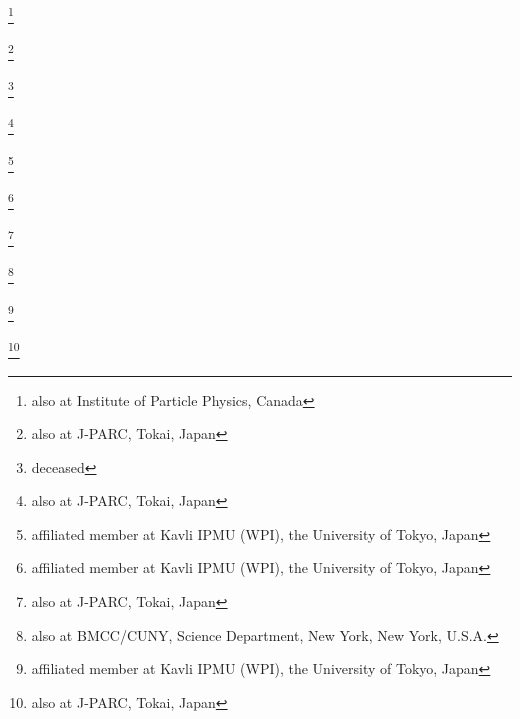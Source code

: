\author{H.A.\,Tanaka}\thanks{also at Institute of Particle Physics, Canada}\INSTD
\author{M.M.\,Tanaka}\thanks{also at J-PARC, Tokai, Japan}\INSTCB
\author{I.J.\,Taylor}\INSTFJ
\author{D.\,Terhorst}\INSTBC
\author{R.\,Terri}\INSTFA
\author{L.F.\,Thompson}\INSTFB
\author{A.\,Thorley}\INSTFC
\author{S.\,Tobayama}\INSTD
\author{W.\,Toki}\INSTFG
\author{T.\,Tomura}\INSTBJ
\author{Y.\,Totsuka}\thanks{deceased}\noaffiliation
\author{C.\,Touramanis}\INSTFC
\author{T.\,Tsukamoto}\thanks{also at J-PARC, Tokai, Japan}\INSTCB
\author{M.\,Tzanov}\INSTFI
\author{Y.\,Uchida}\INSTEI
\author{K.\,Ueno}\INSTBJ
\author{A.\,Vacheret}\INSTGG
\author{M.\,Vagins}\INSTHA\INSTGA
\author{G.\,Vasseur}\INSTI
\author{T.\,Wachala}\INSTDG
\author{A.V.\,Waldron}\INSTGG
\author{C.W.\,Walter}\thanks{affiliated member at Kavli IPMU (WPI), the University of Tokyo, Japan}\INSTFH
\author{D.\,Wark}\INSTEH\INSTGG
\author{M.O.\,Wascko}\INSTEI
\author{A.\,Weber}\INSTEH\INSTGG
\author{R.\,Wendell}\thanks{affiliated member at Kavli IPMU (WPI), the University of Tokyo, Japan}\INSTBJ
\author{R.J.\,Wilkes}\INSTGE
\author{M.J.\,Wilking}\INSTFJ
\author{C.\,Wilkinson}\INSTFB
\author{Z.\,Williamson}\INSTGG
\author{J.R.\,Wilson}\INSTFA
\author{R.J.\,Wilson}\INSTFG
\author{T.\,Wongjirad}\INSTFH
\author{Y.\,Yamada}\thanks{also at J-PARC, Tokai, Japan}\INSTCB
\author{K.\,Yamamoto}\INSTCF
\author{C.\,Yanagisawa}\thanks{also at BMCC/CUNY, Science Department, New York, New York, U.S.A.}\INSTFJ
\author{T.\,Yano}\INSTCC
\author{S.\,Yen}\INSTB
\author{N.\,Yershov}\INSTEB
\author{M.\,Yokoyama}\thanks{affiliated member at Kavli IPMU (WPI), the University of Tokyo, Japan}\INSTCH
\author{T.\,Yuan}\INSTGB
\author{M.\,Yu}\INSTH
\author{A.\,Zalewska}\INSTDG
\author{J.\,Zalipska}\INSTDF
\author{L.\,Zambelli}\thanks{also at J-PARC, Tokai, Japan}\INSTCB
\author{K.\,Zaremba}\INSTDH
\author{M.\,Ziembicki}\INSTDH
\author{E.D.\,Zimmerman}\INSTGB
\author{M.\,Zito}\INSTI
\author{J.\,\.Zmuda}\INSTEA


\noaffiliation
